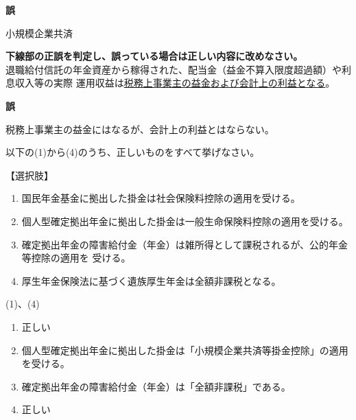 \begin{answerbox}
    \textbf{誤}

  小規模企業共済
\end{answerbox}


\begin{truefalse}[年金1 2018 問題1(3)\textcircled{6}]
\textbf{下線部の正誤を判定し、誤っている場合は正しい内容に改めなさい。}
\\  

退職給付信託の年金資産から稼得された、配当金（益金不算入限度超過額）や利息収入等の実際
運用収益は\underline{税務上事業主の益金および会計上の利益となる}。
\end{truefalse}

\begin{answerbox}
  \textbf{誤}

  税務上事業主の益金にはなるが、会計上の利益とはならない。
\end{answerbox}

\begin{truefalse}[年金1 2025 問題1(6)エ]
  以下の(1)から(4)のうち、正しいものをすべて挙げなさい。

【選択肢】
\begin{enumerate}[(1)]
  \item 国民年金基金に拠出した掛金は社会保険料控除の適用を受ける。
  \item 個人型確定拠出年金に拠出した掛金は一般生命保険料控除の適用を受ける。
  \item 確定拠出年金の障害給付金（年金）は雑所得として課税されるが、公的年金等控除の適用を
受ける。
  \item 厚生年金保険法に基づく遺族厚生年金は全額非課税となる。
\end{enumerate}

\end{truefalse}

\begin{answerbox}
    (1)、(4)
\end{answerbox}

\begin{explanationbox}
  \begin{enumerate}[(1)]
  \item 正しい
  \item 個人型確定拠出年金に拠出した掛金は「小規模企業共済等掛金控除」の適用を受ける。
  \item 確定拠出年金の障害給付金（年金）は「全額非課税」である。
  \item 正しい
\end{enumerate}
\end{explanationbox}


